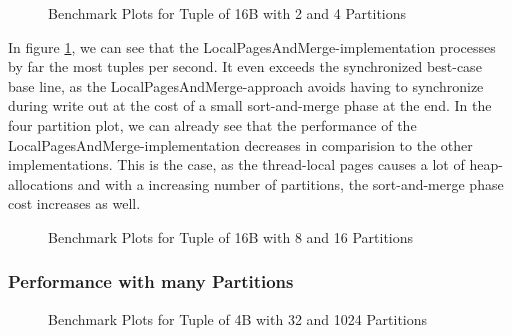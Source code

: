 \begin{figure}[h]
  \centering
  \begin{subfigure}{.49\textwidth}
    \centering
    \resizebox{\linewidth}{!}{}
  \end{subfigure}
  \begin{subfigure}{.49\textwidth}
    \centering
    \resizebox{\linewidth}{!}{}
  \end{subfigure}
  \caption[Shuffle Benchmark Plots for Tuple of 16B with 2 and 4 Partitions]{Benchmark Plots for Tuple of 16B with 2 and 4 Partitions}
  \label{plot-shuffle-16B-2-4}
\end{figure}
In figure \ref{plot-shuffle-16B-2-4}, we can see that the LocalPagesAndMerge-implementation processes by far the most tuples per second.
It even exceeds the synchronized best-case base line, as the LocalPagesAndMerge-approach avoids having to synchronize during write out at the cost of a small sort-and-merge phase at the end.
In the four partition plot, we can already see that the performance of the LocalPagesAndMerge-implementation decreases in comparision to the other implementations.
This is the case, as the thread-local pages causes a lot of heap-allocations and with a increasing number of partitions, the sort-and-merge phase cost increases as well.

\begin{figure}[h]
  \centering
  \begin{subfigure}{.49\textwidth}
    \centering
    \resizebox{\linewidth}{!}{}
  \end{subfigure}
  \begin{subfigure}{.49\textwidth}
    \centering
    \resizebox{\linewidth}{!}{}
  \end{subfigure}
  \caption[Shuffle Benchmark Plots for Tuple of 16B with 8 and 16 Partitions]{Benchmark Plots for Tuple of 16B with 8 and 16 Partitions}
  \label{plot-shuffle-16B-8-16}
\end{figure}

\subsubsection{Performance with many Partitions}
\begin{figure}[h]
  \centering
  \begin{subfigure}{.49\textwidth}
    \centering
    \resizebox{\linewidth}{!}{}
  \end{subfigure}
  \begin{subfigure}{.49\textwidth}
    \centering
    \resizebox{\linewidth}{!}{}
  \end{subfigure}
  \caption[Shuffle Benchmark Plots for Tuple of 4B with 32 and 1024 Partitions]{Benchmark Plots for Tuple of 4B with 32 and 1024 Partitions}
  \label{plot-shuffle-4B-32-1024}
\end{figure}

